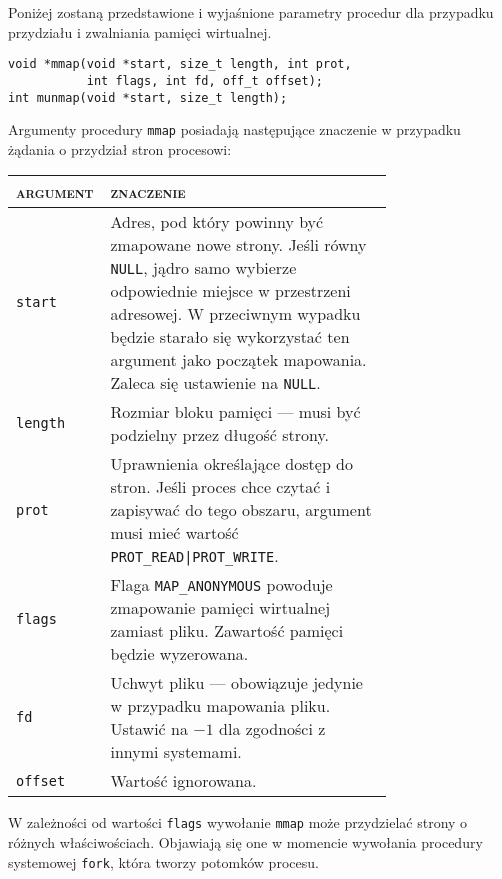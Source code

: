 \documentclass[12pt,a4paper,titlepage,twoside]{mwart}
\begin{document}
Poniżej zostaną przedstawione i wyjaśnione parametry procedur dla przypadku
przydziału i zwalniania pamięci wirtualnej.

\vspace{4ex}
\begin{lstlisting}[caption={Prototypy procedur \texttt{mmap} i \texttt{munmap}.}]
void *mmap(void *start, size_t length, int prot,
           int flags, int fd, off_t offset);
int munmap(void *start, size_t length);
\end{lstlisting}

Argumenty procedury \texttt{mmap} posiadają następujące znaczenie w przypadku
żądania o przydział stron procesowi:
\begin{center}
\begin{tabular}{|l|p{0.75\linewidth}|}
\hline
\textsc{argument} & \textsc{znaczenie} \\
\hline
\hline
\verb+start+  & Adres, pod który powinny być zmapowane nowe strony. Jeśli równy
\texttt{NULL}, jądro samo wybierze odpowiednie miejsce w przestrzeni adresowej.
W przeciwnym wypadku będzie starało się wykorzystać ten argument jako początek
mapowania. Zaleca się ustawienie na \texttt{NULL}.\\
\hline
\verb+length+ & Rozmiar bloku pamięci --- musi być podzielny przez długość strony. \\
\hline
\verb+prot+   & Uprawnienia określające dostęp do stron. Jeśli proces chce
czytać i zapisywać do tego obszaru, argument musi mieć wartość
\verb+PROT_READ|PROT_WRITE+. \\
\hline
\verb+flags+  & Flaga \verb+MAP_ANONYMOUS+ powoduje zmapowanie pamięci
wirtualnej zamiast pliku. Zawartość pamięci będzie wyzerowana. \\
\hline
\verb+fd+     & Uchwyt pliku --- obowiązuje jedynie w przypadku mapowania pliku.
Ustawić na $-1$ dla zgodności z innymi systemami. \\
\hline
\verb+offset+ & Wartość ignorowana. \\
\hline
\end{tabular}
\end{center}

W zależności od wartości \texttt{flags} wywołanie \texttt{mmap} może
przydzielać strony o różnych właściwościach. Objawiają się one w momencie
wywołania procedury systemowej \texttt{fork}, która tworzy potomków procesu.
\end{document}
